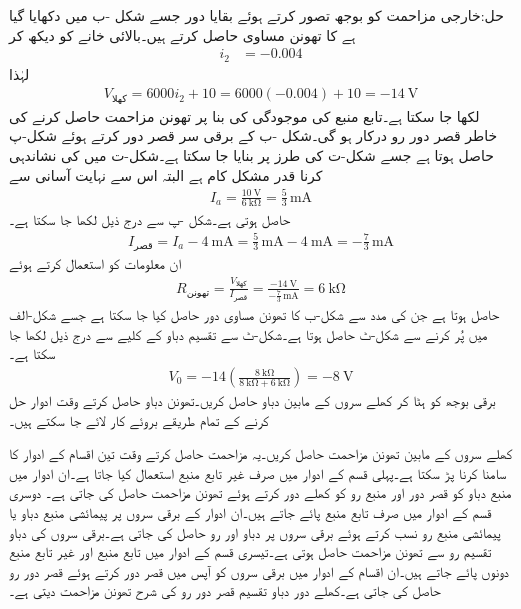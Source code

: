 حل:خارجی  مزاحمت کو بوجھ تصور کرتے ہوئے بقایا دور جسے شکل -ب میں دکھایا گیا ہے کا تھونن مساوی حاصل کرتے ہیں۔بالائی خانے کو دیکھ کر
\begin{align*}
i_2&=-0.004
\end{align*}
لہٰذا
\begin{align*}
V_{\text{کھلا}}=6000 i_2+10= 6000(-0.004)+10=\SI{-14}{\volt}
\end{align*}
لکھا جا سکتا ہے۔تابع منبع کی موجودگی کی بنا پر تھونن مزاحمت حاصل کرنے کی خاطر قصر دور رو درکار ہو گی۔شکل -ب کے برقی سر قصر دور کرتے ہوئے  شکل-پ حاصل ہوتا ہے جسے شکل-ت کی طرز پر بنایا جا سکتا ہے۔شکل-ت میں  کی نشاندہی کرنا قدر مشکل کام ہے البتہ اس سے  نہایت آسانی سے
\begin{align*}
I_a=\frac{\SI{10}{\volt}}{\SI{6}{\kilo\ohm}}=\frac{5}{3}\, \si{\milli\ampere}
\end{align*}
 حاصل ہوتی ہے۔شکل -پ سے درج ذیل لکھا جا سکتا ہے۔
\begin{align*}
I_{\text{قصر}}=I_a-\SI{4}{\milli\ampere}=\frac{5}{3}\, \si{\milli\ampere}-\SI{4}{\milli\ampere}=-\frac{7}{3}\, \si{\milli\ampere}
\end{align*}
ان معلومات کو استعمال کرتے ہوئے
\begin{align*}
R_{\text{تھونن}}=\frac{V_{\text{کھلا}}}{I_{\text{قصر}}}=\frac{\SI{-14}{\volt}}{-\frac{7}{3}\,\si{\milli\ampere}}=\SI{6}{\kilo\ohm}
\end{align*}
حاصل ہوتا ہے جن کی مدد سے شکل-ب کا تھونن مساوی دور حاصل کیا جا سکتا ہے جسے شکل-الف میں پُر کرنے سے شکل-ٹ حاصل ہوتا ہے۔شکل-ٹ سے تقسیم دباو کے کلیے سے درج ذیل لکھا جا سکتا ہے۔
\begin{align*}
V_0=-14 \left(\frac{\SI{8}{\kilo\ohm}}{\SI{8}{\kilo\ohm}+\SI{6}{\kilo\ohm}}\right)=\SI{-8}{\volt}
\end{align*}
برقی بوجھ کو ہٹا کر کھلے سروں کے مابین  دباو  حاصل کریں۔تھونن دباو حاصل کرتے وقت ادوار حل کرنے کے تمام طریقے بروئے کار لائے جا سکتے ہیں۔

کھلے سروں کے مابین تھونن مزاحمت حاصل کریں۔یہ مزاحمت حاصل کرتے وقت تین اقسام کے ادوار کا سامنا کرنا پڑ سکتا ہے۔پہلی قسم  کے ادوار میں صرف غیر تابع منبع استعمال کیا جاتا ہے۔ان ادوار میں منبع دباو کو قصر دور اور منبع رو کو کھلے دور کرتے ہوئے  تھونن مزاحمت حاصل کی جاتی ہے۔ دوسری قسم کے ادوار میں صرف تابع منبع پائے جاتے ہیں۔ان ادوار کے برقی سروں پر پیمائشی منبع دباو یا پیمائشی منبع رو نسب کرتے ہوئے برقی سروں پر دباو اور رو حاصل کی جاتی ہے۔برقی سروں کی دباو تقسیم رو سے تھونن مزاحمت حاصل ہوتی ہے۔تیسری قسم کے ادوار میں تابع منبع اور غیر تابع منبع دونوں پائے جاتے ہیں۔ان اقسام کے ادوار میں برقی سروں کو آپس میں قصر دور کرتے ہوئے قصر دور رو حاصل کی جاتی ہے۔کھلے دور دباو تقسیم قصر دور رو کی شرح تھونن مزاحمت دیتی ہے۔

